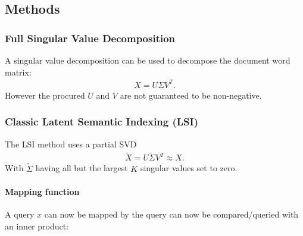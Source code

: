 \subsection{Methods}
\subsubsection{Full Singular Value Decomposition}
A singular value decomposition can be used to decompose the document word matrix:
\begin{align*}
    X = U\Sigma V^T.
\end{align*}
However the procured $U$ and $V$ are not guaranteed to be non-negative. 

\subsubsection{Classic Latent Semantic Indexing (LSI)}
The LSI method uses a partial SVD
\begin{align*}
    \tilde X = U\tilde \Sigma V^T \approx X.
\end{align*}
With $\tilde \Sigma$ having all but the largest $K$ singular values set to zero. 

\paragraph{Mapping function} A query $x$ can now be mapped by the query can now be compared/queried with an inner product:
\begin{align*}

\end{align*}

